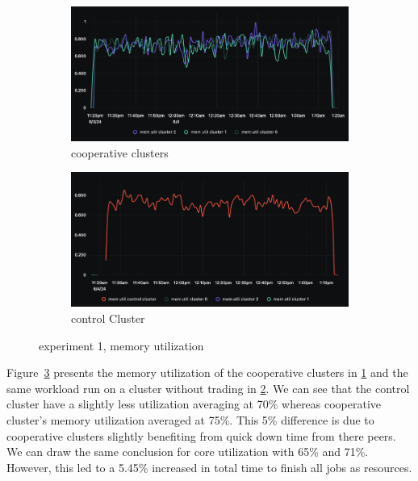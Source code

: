 \begin{figure}[H]
\centering
\begin{subfigure}{.5\textwidth}
  \centering
  \includegraphics[width=.9\linewidth]{./figures/experiment-one/cooperative-clusters-all-at-100-trading-mem-util.png}
  \caption{cooperative clusters}
  \label{fig:exp1coop}
\end{subfigure}%
\begin{subfigure}{.5\textwidth}
  \centering
  \includegraphics[width=.9\linewidth]{./figures/experiment-one/control-mem-util.png}
  \caption{control Cluster}
  \label{fig:exp1control}
\end{subfigure}
\caption{experiment 1, memory utilization}
\label{fig:exp1memutil}
\end{figure}

Figure~\ref{fig:exp1memutil} presents the memory utilization of the cooperative
clusters in \ref{fig:exp1coop} and the same workload run on a cluster without
trading in \ref{fig:exp1control}. We can see that the control cluster have a
slightly less utilization averaging at 70\% whereas cooperative cluster's
memory utilization averaged at 75\%. This 5\% difference is due to cooperative
clusters slightly benefiting from quick down time from there peers. We can draw the same conclusion for core utilization with 65\% and 71\%. However, this led to a 5.45\% increased in total time to finish all jobs as resources.

%
%
